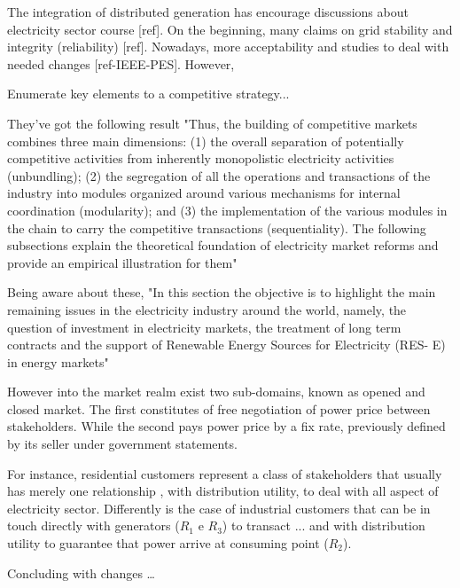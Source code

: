 The integration of distributed generation has encourage discussions about electricity sector course [ref].
On the beginning, many claims on grid stability and integrity (reliability) [ref].
Nowadays, more acceptability and studies to deal with needed changes [ref-IEEE-PES].
However,%

Enumerate key elements to a competitive strategy...

They've got the following result
"Thus, the building of competitive markets combines three main dimensions:
(1) the overall separation of potentially competitive activities from inherently monopolistic electricity activities (unbundling);
(2) the segregation of all the operations and transactions of the industry into modules organized around various mechanisms for internal coordination (modularity); and
(3) the implementation of the various modules in the chain to carry the competitive transactions (sequentiality). The following subsections explain the theoretical foundation of electricity market reforms and provide an empirical illustration for them"

Being aware about these,
"In this section the objective is to highlight the main remaining issues in the electricity industry around the world, namely,
the question of investment in electricity markets,
the treatment of long term contracts and
the support of Renewable Energy Sources for Electricity (RES- E) in energy markets"






However into the market realm exist two sub-domains, known as opened and closed market.
The first constitutes of free negotiation of power price between stakeholders.
While the second pays power price by a fix rate, previously defined by its seller under government statements.

For instance, residential customers represent a class of stakeholders that usually has merely one relationship , with distribution utility, to deal with all aspect of electricity sector.
Differently is the case of industrial customers that can be in touch directly with generators ($R_{1}$ e $R_{3}$) to transact ... and with distribution utility to guarantee that power arrive at consuming point ($R_{2}$).





Concluding with changes \dots \cite{sven2013}

